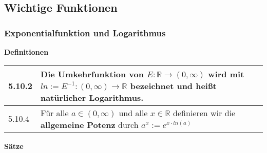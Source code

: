     

    

\subsection{Wichtige Funktionen}
\subsubsection{Exponentialfunktion und Logarithmus}
    \noindent
    \textbf{Definitionen}
      
    \begin{longtable}{p{1cm} p{16cm}}
        \toprule

        5.10.2& Die Umkehrfunktion von $E: \mathbb{R} \rightarrow (0, \infty)$ wird mit $ln := E^{-1}: (0,\infty) \rightarrow \mathbb{R}$
                bezeichnet und heißt \textbf{natürlicher Logarithmus}. \\
        \midrule
        5.10.4& Für alle $a \in (0, \infty)$ und alle $x \in \mathbb{R}$ definieren wir die \textbf{allgemeine Potenz} durch $a^x := e^{x\cdot ln(a)}$ \\   

        \bottomrule

    \end{longtable}
    

    \noindent 
    \textbf{Sätze}
    
